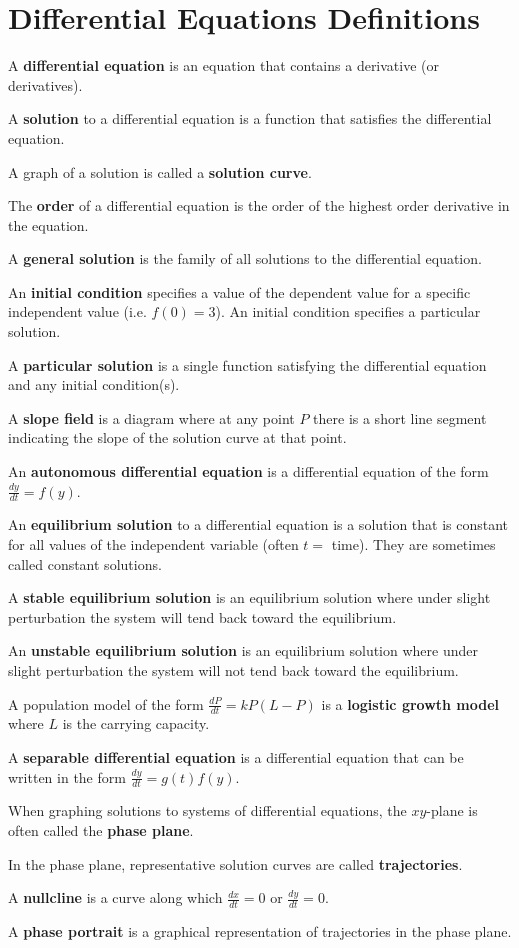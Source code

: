 \documentclass[main]{subfiles}
\begin{document}
\ifSubfilesClassLoaded{%
  \chaptermark{\chapterthree}
}{}

\section*{Differential Equations Definitions} 
A \textbf{differential equation} is an equation that contains a derivative (or derivatives).

A \textbf{solution} to a differential equation is a function that satisfies the differential equation.

A graph of a solution is called a \textbf{solution curve}.

The \textbf{order} of a differential equation is the order of the highest order derivative in the equation.

A \textbf{general solution} is the family of all solutions to the differential equation.

An \textbf{initial condition} specifies a value of the dependent value for a specific independent value (i.e. $f(0)=3$). An initial condition specifies a particular solution.

A \textbf{particular solution} is a single function satisfying the differential equation and any initial condition(s).

A \textbf{slope field} is a diagram where at any point $P$ there is a short line segment indicating the slope of the solution curve at that point.

An \textbf{autonomous differential equation} is a differential equation of the form $\frac{dy}{dt}=f(y)$.

An \textbf{equilibrium solution} to a differential equation is a solution that is constant for all values of the independent variable (often $t=$ time). They are sometimes called constant solutions.

A \textbf{stable equilibrium solution} is an equilibrium solution where under slight perturbation the system will tend back toward the equilibrium.

An \textbf{unstable equilibrium solution} is an equilibrium solution where under slight perturbation the system will not tend back toward the equilibrium.

A population model of the form $\frac{dP}{dt}=kP(L-P)$ is a \textbf{logistic growth model} where $L$ is the carrying capacity.

A \textbf{separable differential equation} is a differential equation that can be written in the form $\frac{dy}{dt}=g(t)f(y)$.

When graphing solutions to systems of differential equations, the $xy$-plane is often called the \textbf{phase plane}.

In the phase plane, representative solution curves are called \textbf{trajectories}.

A \textbf{nullcline} is a curve along which $\frac{dx}{dt}=0$ or $\frac{dy}{dt}=0$.

A \textbf{phase portrait} is a graphical representation of trajectories in the phase plane.
\end{document}
